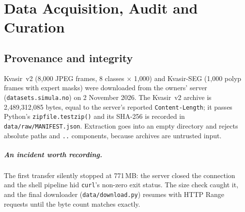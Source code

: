 \chapter{Data Acquisition, Audit and Curation}
\section{Provenance and integrity}
Kvasir~v2 (8{,}000 JPEG frames, 8 classes $\times$ 1{,}000) and Kvasir-SEG (1{,}000 polyp frames with expert masks) were downloaded from the owners'
server (\texttt{datasets.simula.no}) on 2 November 2026. The Kvasir~v2 archive is 2{,}489{,}312{,}085 bytes, equal to the server's reported
\texttt{Content-Length}; it passes Python's \texttt{zipfile.testzip()} and its SHA-256 is recorded in \texttt{data/raw/MANIFEST.json}. Extraction goes into an
empty directory and rejects absolute paths and \texttt{..} components, because archives are untrusted input.

\paragraph{An incident worth recording.} The first transfer silently stopped at 771\,MB: the server closed the connection and the shell pipeline hid
\texttt{curl}'s non-zero exit status. The size check caught it, and the final downloader (\texttt{data/download.py}) resumes with HTTP Range requests until the
byte count matches exactly.

